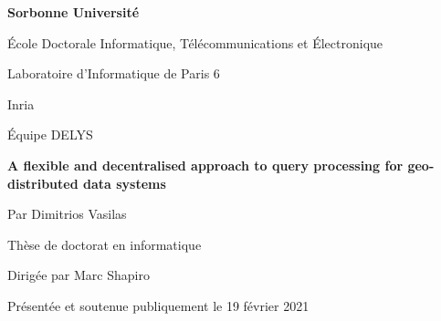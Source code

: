 \documentclass[a4paper,usenames,dvipsnames]{report}
\begin{document}
\vspace*{1.5cm}

\begin{center}

{\Huge{\bf Sorbonne Universit\'e}}

\vspace*{1cm}

{\Large\'Ecole Doctorale Informatique, T\'el\'ecommunications et \'Electronique}

\vspace*{0.3cm}

{\Large Laboratoire d’Informatique de Paris 6}

\vspace*{0.3cm}

{\Large Inria}

\vspace*{0.3cm}

{\Large \'Equipe DELYS}

\vspace*{1cm}

{\LARGE {\bf A flexible and decentralised approach to query processing for geo-distributed data systems}}

\vspace*{1.5cm}

{\Large Par Dimitrios Vasilas}

\vspace*{1cm}

{\Large Th\`ese de doctorat en informatique}

\vspace*{1cm}

{\Large Dirig\'ee par Marc Shapiro}

\vspace*{1cm}

{\large Pr\'esent\'ee et soutenue publiquement le 19 f\'evrier 2021}

\end{center}
\end{document}

